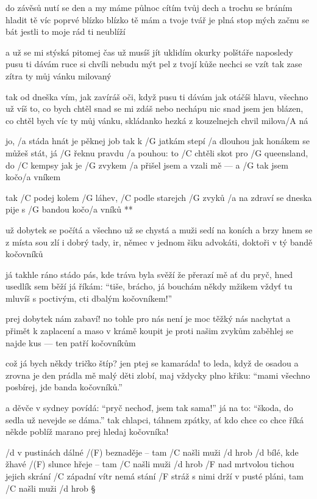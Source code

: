 do závěsů nutí se den a my máme půlnoc
cítím tvůj dech a trochu se bráním hladit tě víc
poprvé blízko blízko tě mám
a tvoje tvář je plná stop mých
začnu se bát jestli to moje rád ti neublíží \s

a už se mi stýská pitomej čas už musíš jít
uklidím okurky polštáře naposledy pusu ti dávám
ruce si chvíli nebudu mýt
pel z tvojí kůže nechci se vzít
tak zase zítra ty můj vánku milovaný \s

tak od dneška vím, jak zavíráš oči, když pusu ti dávám
jak otáčíš hlavu, všechno už víš to, co bych chtěl
snad se mi zdáš nebo nechápu nic
snad jsem jen blázen, co chtěl bych víc
ty můj vánku, skládanko hezká z kouzelnejch chvil
milova/A ná




jo, /a stáda hnát je pěknej job tak k /G jatkám stepí /a dlouhou
jak honákem se můžeš stát, já /G řeknu pravdu /a pouhou:
to /C chtěli skot pro /G queensland, do /C kempsy jak je /G zvykem
/a přišel jsem a vzali mě --- a /G tak jsem kočo/a vníkem

\R tak /C podej kolem /G láhev, /C podle starejch /G zvyků
   /a na zdraví se dneska pije s /G bandou kočo/a vníků **

už dobytek se počítá a všechno už se chystá
a muži sedí na koních a brzy hnem se z místa
sou zlí i dobrý tady, ir, němec v jednom šiku
advokáti, doktoři v tý bandě kočovníků \s

já takhle ráno stádo pás, kde tráva byla svěží
že přerazí mě ať du pryč, hned usedlík sem běží
já říkám:  ``tiše, brácho, já bouchám někdy mžikem
vždyť tu mluvíš s poctivým, cti dbalým kočovníkem!'' \s

prej dobytek nám zabaví! no tohle pro nás není
je moc těžký nás nachytat a přimět k zaplacení
a maso v krámě koupit je proti našim zvykům
zaběhlej se najde kus --- ten patří kočovníkům \s

což já bych někdy tričko štíp? jen ptej se kamaráda!
to leda, když de osadou a zrovna je den prádla
mě malý děti zlobí, maj vždycky plno křiku:
``mami všechno posbírej, jde banda kočovníků.'' \s

a děvče v sydney povídá: ``pryč nechoď, jsem tak sama!''
já na to: ``škoda, do sedla už nevejde se dáma.''
tak chlapci, táhnem zpátky, ať kdo chce co chce říká
někde poblíž marano prej hledaj kočovníka!




/d v pustinách dálné /(F) beznaděje -- tam /C našli muži /d hrob
/d bílé, kde žhavé /(F) slunce hřeje -- tam /C našli muži /d hrob
/F nad mrtvolou tichou jejich skrání /C západní vítr nemá stání
/F stráž s nimi drží v pusté pláni, tam /C našli muži /d hrob \S

